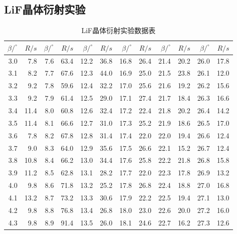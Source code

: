 \documentclass[UTF8]{ctexart}
\begin{document}
	\subsection{LiF晶体衍射实验}{
		\centering
	\begin{longtable}{||r|r||r|r||r|r||r|r||r|r||r|r||}
		\caption{LiF晶体衍射实验数据表}
		\\ \hline
		\hline
		$\beta/^{\circ}$     & $R/s$     & $\beta/^{\circ}$     & $R/s$     & $\beta/^{\circ}$     & $R/s$     & $\beta/^{\circ}$     & $R/s$ & $\beta/^{\circ}$     & $R/s$ & $\beta/^{\circ}$     & $R/s$\\
		\hline
		3.0   & 7.8   & 7.6   & 63.4  & 12.2  & 36.8  & 16.8  & 26.4  & 21.4  & 20.2  & 26.0  & 17.8  \\
		3.1   & 8.2   & 7.7   & 67.6  & 12.3  & 44.0  & 16.9  & 25.0  & 21.5  & 23.8  & 26.1  & 12.0  \\
		3.2   & 9.2   & 7.8   & 59.6  & 12.4  & 32.2  & 17.0  & 25.6  & 21.6  & 19.2  & 26.2  & 15.6  \\
		3.3   & 9.2   & 7.9   & 61.4  & 12.5  & 29.0  & 17.1  & 27.4  & 21.7  & 18.4  & 26.3  & 16.6  \\
		3.4   & 11.4  & 8.0   & 60.8  & 12.6  & 32.4  & 17.2  & 22.4  & 21.8  & 20.2  & 26.4  & 14.2  \\
		3.5   & 11.4  & 8.1   & 66.6  & 12.7  & 31.0  & 17.3  & 25.2  & 21.9  & 18.6  & 26.5  & 17.0  \\
		3.6   & 7.8   & 8.2   & 67.8  & 12.8  & 31.4  & 17.4  & 22.0  & 22.0  & 19.4  & 26.6  & 12.4  \\
		3.7   & 9.0   & 8.3   & 64.0  & 12.9  & 35.6  & 17.5  & 26.6  & 22.1  & 15.2  & 26.7  & 12.4  \\
		3.8   & 10.8  & 8.4   & 66.2  & 13.0  & 34.4  & 17.6  & 25.8  & 22.2  & 21.8  & 26.8  & 15.8  \\
		3.9   & 11.2  & 8.5   & 62.8  & 13.1  & 28.2  & 17.7  & 22.0  & 22.3  & 17.8  & 26.9  & 13.2  \\
		4.0   & 9.8   & 8.6   & 71.8  & 13.2  & 25.2  & 17.8  & 26.8  & 22.4  & 18.8  & 27.0  & 16.8  \\
		4.1   & 13.2  & 8.7   & 73.2  & 13.3  & 30.6  & 17.9  & 22.2  & 22.5  & 19.4  & 27.1  & 13.0  \\
		4.2   & 9.8   & 8.8   & 76.8  & 13.4  & 26.8  & 18.0  & 23.0  & 22.6  & 20.0  & 27.2  & 16.0  \\
		4.3   & 9.8   & 8.9   & 91.4  & 13.5  & 26.0  & 18.1  & 24.6  & 22.7  & 16.2  & 27.3  & 12.6  \\
		\hline
		\hline

\end{longtable}}
\end{document}
